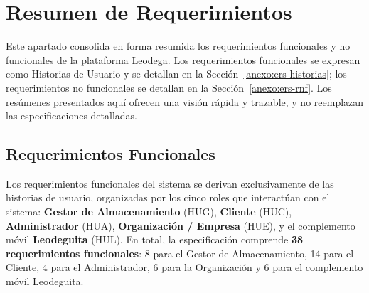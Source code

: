 \clearpage

\section{Resumen de Requerimientos}
\label{anexo:ers-resumen}

\noindent Este apartado consolida en forma resumida los requerimientos funcionales y no funcionales de la plataforma Leodega. Los requerimientos funcionales se expresan como Historias de Usuario y se detallan en la Sección~\ref{anexo:ers-historias}; los requerimientos no funcionales se detallan en la Sección~\ref{anexo:ers-rnf}. Los resúmenes presentados aquí ofrecen una visión rápida y trazable, y no reemplazan las especificaciones detalladas.

\subsection{Requerimientos Funcionales}

Los requerimientos funcionales del sistema se derivan exclusivamente de las historias de usuario, organizadas por los cinco roles que interactúan con el sistema: \textbf{Gestor de Almacenamiento} (HUG), \textbf{Cliente} (HUC), \textbf{Administrador} (HUA), \textbf{Organización / Empresa} (HUE), y el complemento móvil \textbf{Leodeguita} (HUL). En total, la especificación comprende \textbf{38 requerimientos funcionales}: 8 para el Gestor de Almacenamiento, 14 para el Cliente, 4 para el Administrador, 6 para la Organización y 6 para el complemento móvil Leodeguita.

